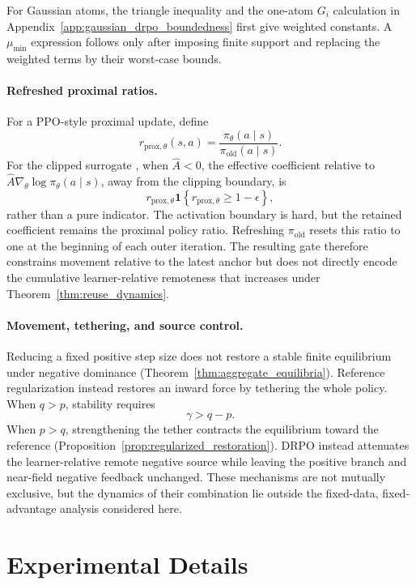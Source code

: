 \documentclass{article}
\theoremstyle{plain}
\theoremstyle{definition}
\theoremstyle{remark}
\begin{document}
For Gaussian atoms, the triangle inequality and the one-atom \(G_i\)
calculation in Appendix~\ref{app:gaussian_drpo_boundedness} first give
weighted constants. A \(\mu_{\min}\) expression follows only after
imposing finite support and replacing the weighted terms by their
worst-case bounds.

\paragraph{Refreshed proximal ratios.}
For a PPO-style proximal update, define
\[
r_{\mathrm{prox},\theta}(s,a)
=
\frac{\pi_\theta(a\mid s)}
     {\pi_{\mathrm{old}}(a\mid s)}.
\]
For the clipped surrogate
\citep{schulman2017proximal}, when \(\widehat A<0\), the effective
coefficient relative to
\(\widehat A\nabla_\theta\log\pi_\theta(a\mid s)\), away from the clipping
boundary, is
\[
r_{\mathrm{prox},\theta}
\mathbf 1
\left\{
    r_{\mathrm{prox},\theta}
    \geq
    1-\epsilon
\right\},
\]
rather than a pure indicator. The activation boundary is hard, but the
retained coefficient remains the proximal policy ratio. Refreshing
\(\pi_{\mathrm{old}}\) resets this ratio to one at the beginning of each
outer iteration. The resulting gate therefore constrains movement relative
to the latest anchor but does not directly encode the cumulative
learner-relative remoteness that increases under
Theorem~\ref{thm:reuse_dynamics}.

\paragraph{Movement, tethering, and source control.}
Reducing a fixed positive step size does not restore a stable finite
equilibrium under negative dominance
(Theorem~\ref{thm:aggregate_equilibria}). Reference regularization instead
restores an inward force by tethering the whole policy. When \(q>p\),
stability requires
\[
\gamma>q-p.
\]
When \(p>q\), strengthening the tether contracts the equilibrium toward
the reference
(Proposition~\ref{prop:regularized_restoration}). DRPO instead attenuates
the learner-relative remote negative source while leaving the positive
branch and near-field negative feedback unchanged. These mechanisms are
not mutually exclusive, but the dynamics of their combination lie outside
the fixed-data, fixed-advantage analysis considered here.

\section{Experimental Details}
\label{app:experimental_details}
\end{document}
